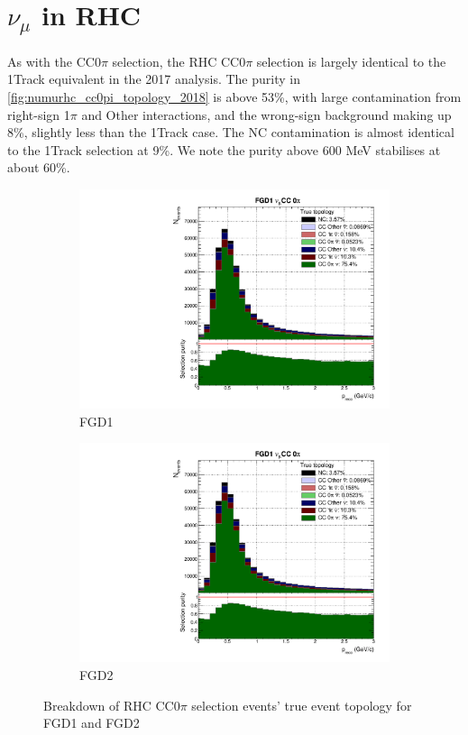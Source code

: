 \section{$\nu_\mu$ in RHC}
As with the \numubar CC0$\pi$ selection, the \numu RHC CC0$\pi$ selection is largely identical to the 1Track equivalent in the 2017 analysis. The purity in \autoref{fig:numurhc_cc0pi_topology_2018} is above 53\%, with large contamination from right-sign 1$\pi$ and Other interactions, and the wrong-sign background making up 8\%, slightly less than the 1Track case. The NC contamination is almost identical to the 1Track selection at 9\%. We note the purity above 600 MeV stabilises at about 60\%.
\begin{figure}[h]
	\begin{subfigure}[t]{0.49\textwidth}
		\includegraphics[width=\textwidth,page=25, trim={0mm 0mm 0mm 9mm}, clip]{figures/mach3/2018/Selection/2018_RedNDmatrix_rebin_verbose_may_noweights_diagnostics}
		\caption{FGD1}
	\end{subfigure}
	\begin{subfigure}[t]{0.49\textwidth}
		\includegraphics[width=\textwidth,page=31, trim={0mm 0mm 0mm 9mm}, clip]{figures/mach3/2018/Selection/2018_RedNDmatrix_rebin_verbose_may_noweights_diagnostics}
		\caption{FGD2}
	\end{subfigure}
	\caption{Breakdown of \numu RHC CC0$\pi$ selection events' true event topology for FGD1 and FGD2 }
	\label{fig:numurhc_cc0pi_topology_2018}
\end{figure}

